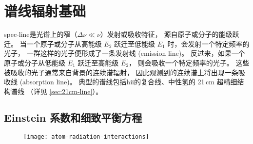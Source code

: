 \section{谱线辐射基础}
\label{sec:spectral-line}

\acf{spec-line}是光谱上的窄（$\Delta\nu \ll \nu$）发射或吸收特征，
源自原子或分子的能级跃迁。
当一个原子或分子从高能级 $E_2$ 跃迁至低能级 $E_1$ 时，会发射一个特定频率的光子，
一群这样的光子便形成了一条发射线 (emission line)。
反过来，如果一个原子或分子从低能级 $E_1$ 跃迁至高能级 $E_2$，
则会吸收一个特定频率的光子。
这些被吸收的光子通常来自背景的连续谱辐射，
因此观测到的连续谱上将出现一条吸收线 (absorption line)。
典型的谱线包括\ac{hii}的复合线、中性氢的 21\,cm 超精细结构谱线
（详见 \autoref{sec:21cm-line}）。

\subsection{Einstein 系数和细致平衡方程}

\begin{figure}[htp]
  \centering
  \texttt{[image: atom-radiation-interactions]}
  \label{fig:atom-interactions}
\end{figure}

